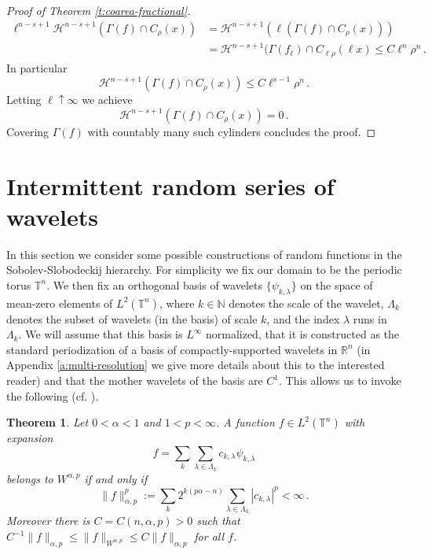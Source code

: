 \documentclass[11pt,reqno]{amsart}
\renewcommand{\H}{\mathcal{H}}
\newtheorem{theorem}{Theorem}[section]
\theoremstyle{definition}
\numberwithin{equation}{section}
\begin{document}
\begin{proof}[Proof of Theorem \ref{t:coarea-fractional}]
\begin{align}
\ell^{n-s+1} \H^{n-s+1} (\Gamma (f) \cap C_\rho (x)) 
& = \H^{n-s+1} (\ell (\Gamma (f) \cap C_\rho (x)))\nonumber\\
&= \H^{n-s+1} (\Gamma (f_\ell) \cap C_{\ell \rho} (\ell x) 
\leq C \ell^n \rho^n\, .\label{e:global-3}
\end{align} 
In particular 
\[
\H^{n-s+1} (\Gamma (f) \cap C_\rho (x)) \leq C \ell^{s-1} \rho^n\, .
\]
Letting $\ell\uparrow \infty$ we achieve 
\[
\H^{n-s+1} (\Gamma (f)\cap C_\rho (x)) = 0\, .
\]
Covering $\Gamma (f)$ with countably many such cylinders concludes the proof.
\end{proof}

\section{Intermittent random series of wavelets}\label{s:random}

In this section we consider some possible constructions of random functions in the Sobolev-Slobodeckij hierarchy. For simplicity we fix our domain to be the periodic torus $\mathbb T^n$. We then fix an orthogonal basis of wavelets $\{\psi_{k, \lambda}\}$ on the space of mean-zero elements of $L^2 (\mathbb T^n)$, where $k\in \mathbb N$ denotes the scale of the wavelet, $\Lambda_k$ denotes the subset of wavelets (in the basis) of scale $k$, and the index $\lambda$ runs in $\Lambda_k$. We will assume that this basis is $L^\infty$ normalized, that it is constructed as the standard periodization of a basis of compactly-supported wavelets in $\mathbb R^n$  (in Appendix \ref{a:multi-resolution} we give more details about this to the interested reader) and that the mother wavelets of the basis are $C^1$. This allows us to invoke the following (cf. \cite[Chapter 9]{Dau92}).

\begin{theorem}\label{t:PL-wavelets}
Let $0<\alpha <1$ and $1 < p < \infty$. A function $f\in L^2 (\mathbb T^n)$ with expansion
\[
f = \sum_k \sum_{\lambda \in \Lambda_k} c_{k,\lambda} \psi_{k,\lambda}
\]
belongs to $W^{\alpha,p}$ if and only if 
\[
\|f\|^p_{\alpha,p} := \sum_k 2^{k (p \alpha -n)} \sum_{\lambda \in \Lambda_k} |c_{k,\lambda}|^p < \infty\, .
\]
Moreover there is $C= C(n,\alpha, p)>0$ such that $C^{-1} \|f\|_{\alpha, p} \leq \|f\|_{W^{\alpha,p}} \leq C \|f\|_{\alpha, p}$ for all $f$.
\end{theorem}
\end{document}
